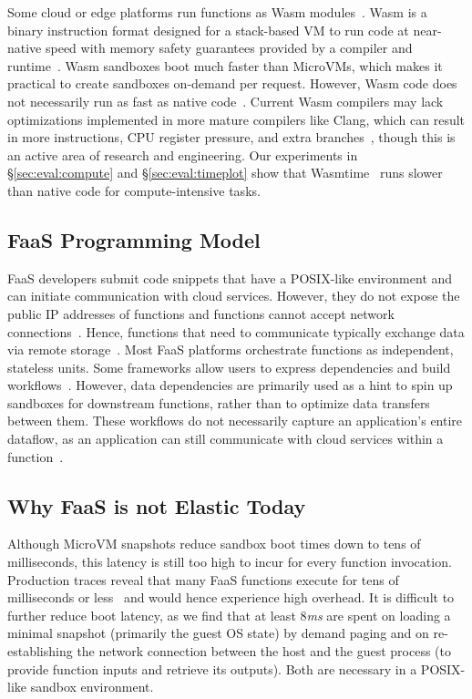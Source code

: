 Some cloud or edge platforms run functions as Wasm modules~\cite{cloudflare-wasm, fastly-wasm, faasm, sledge, spin, hyperlight-wasm}.
Wasm is a binary instruction format designed for a stack-based VM to run code at near-native speed with memory safety guarantees provided by a compiler and runtime~\cite{wasm}.
Wasm sandboxes boot much faster than MicroVMs, which makes it practical to create sandboxes on-demand per request. However, Wasm code does not necessarily run as fast as native code~\cite{lightweight-fault-wasm,understanding-wasm-perf, sledge}. Current Wasm compilers may lack optimizations implemented in more mature compilers like Clang, which can result in more instructions, CPU register pressure, and extra branches~\cite{not-so-fast-wasm}, though this is an active area of research and engineering.
Our experiments in \S\ref{sec:eval:compute} and \S\ref{sec:eval:timeplot} show that Wasmtime~\cite{wasmtime} runs slower than native code for compute-intensive tasks.

\subsection{FaaS Programming Model}
FaaS developers submit code snippets that have a POSIX-like environment and can initiate communication with cloud services.
However, they do not expose the public IP addresses of functions and functions cannot accept network connections~\cite{wawrzoniak2021boxer}. Hence, functions that need to communicate typically exchange data via remote storage~\cite{pocket, locus}.
Most FaaS platforms orchestrate functions as independent, stateless units. Some frameworks allow users to express dependencies and build workflows~\cite{aws-step-functions,aws-airflow,azure-durable-functions}.
However, data dependencies are primarily used as a hint to spin up sandboxes for downstream functions, rather than to optimize data transfers between them. These workflows do not necessarily capture an application's entire dataflow, as an application can still communicate with cloud services within a function~\cite{yu2023following, dataflower, compute-centric-networking}.

\subsection{Why FaaS is not Elastic Today}

Although MicroVM snapshots reduce sandbox boot times down to tens of milliseconds, this latency is still too high to incur for every function invocation. Production traces reveal that many FaaS functions execute for tens of milliseconds or less~\cite{huawei-function-trace, datadog:state21} and would hence experience high overhead.
It is difficult to further reduce boot latency, as we find that at least 8\textit{ms} are spent on loading a minimal snapshot (primarily the guest OS state) by demand paging and on re-establishing the network connection between the host and the guest process (to provide function inputs and retrieve its outputs). Both are necessary in a POSIX-like sandbox environment.

